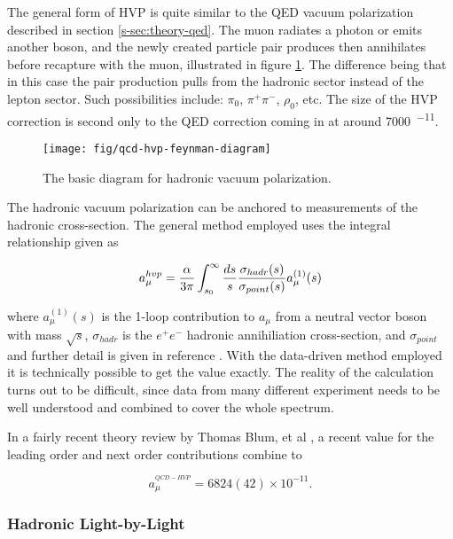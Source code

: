 The general form of HVP is quite similar to the QED vacuum polarization described in section \ref{s-sec:theory-qed}.  The muon radiates a photon or emits another boson, and the newly created particle pair produces then annihilates before recapture with the muon, illustrated in figure \ref{fig:qcd-hvp-feynman-diagram}.  The difference being that in this case the pair production pulls from the hadronic sector instead of the lepton sector.  Such possibilities include: $\pi_0$, $\pi^+\pi^-$, $\rho_0$, etc.  The size of the HVP correction is second only to the QED correction coming in at around \SI{7000}{^{-11}}.

\begin{figure}
\centering
\texttt{[image: fig/qcd-hvp-feynman-diagram]}
\caption{The basic diagram for hadronic vacuum polarization. \label{fig:qcd-hvp-feynman-diagram}}
\end{figure}

The hadronic vacuum polarization can be anchored to measurements of the hadronic cross-section.  The general method employed uses the integral relationship given as

\begin{equation}
\label{eqn:qcd-hvp-integral}
a_\mu^{hvp} = \frac{\alpha}{3\pi} \int_{s_0}^{\infty} \frac{ds}{s} \\
\frac{\sigma_{hadr}(s)}{\sigma_{point}(s)} a_\mu^{(1)}(s)
\end{equation}

\noindent
where $a_\mu^{(1)}(s)$ is the 1-loop contribution to $a_\mu$ from a neutral vector boson with mass $\sqrt{s}$, $\sigma_{hadr}$ is the $e^+e^-$ hadronic annihiliation cross-section, and $\sigma_{point}$ and further detail is given in reference \cite{amm-of-muon}.  With the data-driven method employed it is technically possible to get the value exactly.  The reality of the calculation turns out to be difficult, since data from many different experiment needs to be well understood and combined to cover the whole spectrum.  

In a fairly recent theory review by Thomas Blum, et al \cite{muon-g-2-blum}, a recent value for the leading order and next order contributions combine to 

\begin{equation}
\label{eqn:qcd-hvp-total}
a_\mu^{^{QCD-HVP}} = 6824(42) \times 10^{-11}.
\end{equation}

\subsubsection{Hadronic Light-by-Light}

